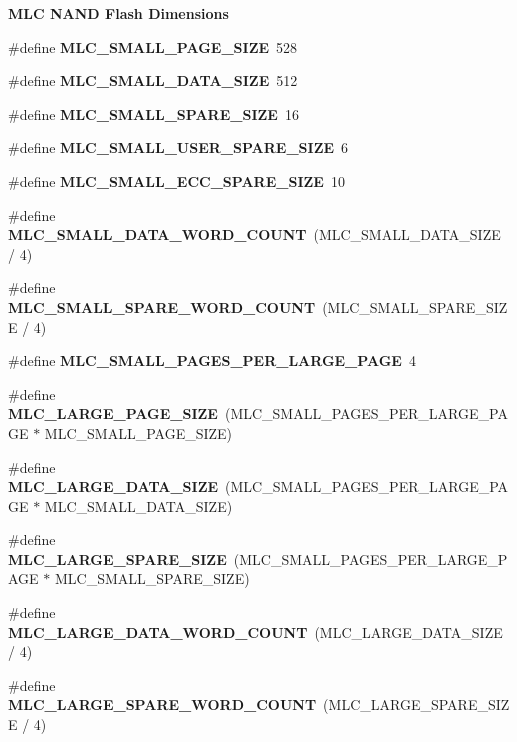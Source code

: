 \begin{Indent}\textbf{ M\+LC N\+A\+ND Flash Dimensions}\par
\begin{DoxyCompactItemize}
\item 
\#define {\bfseries M\+L\+C\+\_\+\+S\+M\+A\+L\+L\+\_\+\+P\+A\+G\+E\+\_\+\+S\+I\+ZE}~528
\item 
\#define {\bfseries M\+L\+C\+\_\+\+S\+M\+A\+L\+L\+\_\+\+D\+A\+T\+A\+\_\+\+S\+I\+ZE}~512
\item 
\#define {\bfseries M\+L\+C\+\_\+\+S\+M\+A\+L\+L\+\_\+\+S\+P\+A\+R\+E\+\_\+\+S\+I\+ZE}~16
\item 
\#define {\bfseries M\+L\+C\+\_\+\+S\+M\+A\+L\+L\+\_\+\+U\+S\+E\+R\+\_\+\+S\+P\+A\+R\+E\+\_\+\+S\+I\+ZE}~6
\item 
\#define {\bfseries M\+L\+C\+\_\+\+S\+M\+A\+L\+L\+\_\+\+E\+C\+C\+\_\+\+S\+P\+A\+R\+E\+\_\+\+S\+I\+ZE}~10
\item 
\#define {\bfseries M\+L\+C\+\_\+\+S\+M\+A\+L\+L\+\_\+\+D\+A\+T\+A\+\_\+\+W\+O\+R\+D\+\_\+\+C\+O\+U\+NT}~(M\+L\+C\+\_\+\+S\+M\+A\+L\+L\+\_\+\+D\+A\+T\+A\+\_\+\+S\+I\+ZE / 4)
\item 
\#define {\bfseries M\+L\+C\+\_\+\+S\+M\+A\+L\+L\+\_\+\+S\+P\+A\+R\+E\+\_\+\+W\+O\+R\+D\+\_\+\+C\+O\+U\+NT}~(M\+L\+C\+\_\+\+S\+M\+A\+L\+L\+\_\+\+S\+P\+A\+R\+E\+\_\+\+S\+I\+ZE / 4)
\item 
\#define {\bfseries M\+L\+C\+\_\+\+S\+M\+A\+L\+L\+\_\+\+P\+A\+G\+E\+S\+\_\+\+P\+E\+R\+\_\+\+L\+A\+R\+G\+E\+\_\+\+P\+A\+GE}~4
\item 
\#define {\bfseries M\+L\+C\+\_\+\+L\+A\+R\+G\+E\+\_\+\+P\+A\+G\+E\+\_\+\+S\+I\+ZE}~(M\+L\+C\+\_\+\+S\+M\+A\+L\+L\+\_\+\+P\+A\+G\+E\+S\+\_\+\+P\+E\+R\+\_\+\+L\+A\+R\+G\+E\+\_\+\+P\+A\+GE $\ast$ M\+L\+C\+\_\+\+S\+M\+A\+L\+L\+\_\+\+P\+A\+G\+E\+\_\+\+S\+I\+ZE)
\item 
\#define {\bfseries M\+L\+C\+\_\+\+L\+A\+R\+G\+E\+\_\+\+D\+A\+T\+A\+\_\+\+S\+I\+ZE}~(M\+L\+C\+\_\+\+S\+M\+A\+L\+L\+\_\+\+P\+A\+G\+E\+S\+\_\+\+P\+E\+R\+\_\+\+L\+A\+R\+G\+E\+\_\+\+P\+A\+GE $\ast$ M\+L\+C\+\_\+\+S\+M\+A\+L\+L\+\_\+\+D\+A\+T\+A\+\_\+\+S\+I\+ZE)
\item 
\#define {\bfseries M\+L\+C\+\_\+\+L\+A\+R\+G\+E\+\_\+\+S\+P\+A\+R\+E\+\_\+\+S\+I\+ZE}~(M\+L\+C\+\_\+\+S\+M\+A\+L\+L\+\_\+\+P\+A\+G\+E\+S\+\_\+\+P\+E\+R\+\_\+\+L\+A\+R\+G\+E\+\_\+\+P\+A\+GE $\ast$ M\+L\+C\+\_\+\+S\+M\+A\+L\+L\+\_\+\+S\+P\+A\+R\+E\+\_\+\+S\+I\+ZE)
\item 
\#define {\bfseries M\+L\+C\+\_\+\+L\+A\+R\+G\+E\+\_\+\+D\+A\+T\+A\+\_\+\+W\+O\+R\+D\+\_\+\+C\+O\+U\+NT}~(M\+L\+C\+\_\+\+L\+A\+R\+G\+E\+\_\+\+D\+A\+T\+A\+\_\+\+S\+I\+ZE / 4)
\item 
\#define {\bfseries M\+L\+C\+\_\+\+L\+A\+R\+G\+E\+\_\+\+S\+P\+A\+R\+E\+\_\+\+W\+O\+R\+D\+\_\+\+C\+O\+U\+NT}~(M\+L\+C\+\_\+\+L\+A\+R\+G\+E\+\_\+\+S\+P\+A\+R\+E\+\_\+\+S\+I\+ZE / 4)
\end{DoxyCompactItemize}
\end{Indent}

